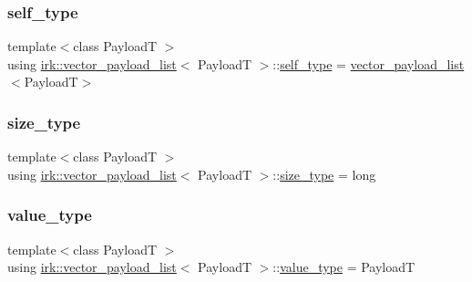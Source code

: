 \subsubsection{\texorpdfstring{self\+\_\+type}{self\_type}}
{\footnotesize\ttfamily template$<$class PayloadT $>$ \\
using \mbox{\hyperlink{classirk_1_1vector__payload__list}{irk\+::vector\+\_\+payload\+\_\+list}}$<$ PayloadT $>$\+::\mbox{\hyperlink{classirk_1_1vector__payload__list_a9312dea19fb0ee4e9c35e0def20e14d5}{self\+\_\+type}} =  \mbox{\hyperlink{classirk_1_1vector__payload__list}{vector\+\_\+payload\+\_\+list}}$<$PayloadT$>$}

\mbox{\label{classirk_1_1vector__payload__list_a319d51342d589c056943998b362120ca}} 
\subsubsection{\texorpdfstring{size\+\_\+type}{size\_type}}
{\footnotesize\ttfamily template$<$class PayloadT $>$ \\
using \mbox{\hyperlink{classirk_1_1vector__payload__list}{irk\+::vector\+\_\+payload\+\_\+list}}$<$ PayloadT $>$\+::\mbox{\hyperlink{classirk_1_1vector__payload__list_a319d51342d589c056943998b362120ca}{size\+\_\+type}} =  long}

\mbox{\label{classirk_1_1vector__payload__list_acded07bf18f4c147495e0b0dfdbf8922}} 
\subsubsection{\texorpdfstring{value\+\_\+type}{value\_type}}
{\footnotesize\ttfamily template$<$class PayloadT $>$ \\
using \mbox{\hyperlink{classirk_1_1vector__payload__list}{irk\+::vector\+\_\+payload\+\_\+list}}$<$ PayloadT $>$\+::\mbox{\hyperlink{classirk_1_1vector__payload__list_acded07bf18f4c147495e0b0dfdbf8922}{value\+\_\+type}} =  PayloadT}



